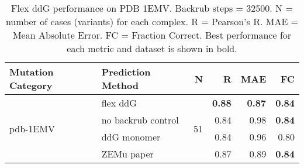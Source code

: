 \begin{table}
  \begin{tabular}{llrrrr}
\toprule
Mutation Category &   Prediction Method &   N &    R &  MAE &   FC \\
\midrule
 \multirow{ 4}{*}{pdb-1EMV} & flex ddG & \multirow{ 4}{*}{51} & \textbf{0.88} & \textbf{0.87} & \textbf{0.84}  \\
 & no backrub control & & 0.84 & 0.98 & \textbf{0.84}  \\
 & ddG monomer & & 0.84 & 0.96 & 0.80  \\
 & ZEMu paper & & 0.87 & 0.89 & \textbf{0.84}  \\
\bottomrule
\end{tabular}
  \caption[Flex ddG performance on PDB 1EMV]{
    Flex ddG performance on PDB 1EMV. Backrub steps = 32500. N = number of cases (variants) for each complex. R = Pearson's R. MAE = Mean Absolute Error. FC = Fraction Correct. Best performance for each metric and dataset is shown in bold.
  } \label{tab:table-pdb-1EMV}
\end{table}
